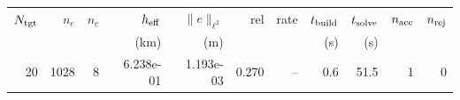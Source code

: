 \begin{tabular}{rrrrrrrrrrr}
\hline
$N_{\rm tgt}$ & $n_e$ & $n_c$ & $h_{\rm eff}$ & $\|e\|_{\ell^2}$ & rel & rate & $t_{\rm build}$ & $t_{\rm solve}$ & $n_{\rm acc}$ & $n_{\rm rej}$ \\
 & & & (km) & (m) & & & (s) & (s) & & \\
\hline
20 & 1028 & 8 & 6.238e-01 & 1.193e-03 & 0.270 & -- & 0.6 & 51.5 & 1 & 0 \\
\hline
\end{tabular}
